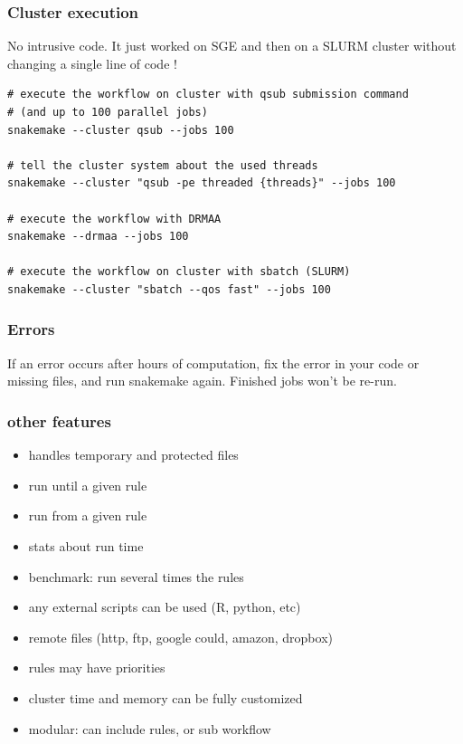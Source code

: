 \documentclass{beamer}
\begin{document}



\begin{frame}[fragile]
\frametitle{Cluster execution}

No intrusive code. It just worked on SGE and then on a SLURM cluster 
without changing a single line of code !

\begin{lstlisting}
# execute the workflow on cluster with qsub submission command
# (and up to 100 parallel jobs)
snakemake --cluster qsub --jobs 100

# tell the cluster system about the used threads
snakemake --cluster "qsub -pe threaded {threads}" --jobs 100

# execute the workflow with DRMAA
snakemake --drmaa --jobs 100

# execute the workflow on cluster with sbatch (SLURM)
snakemake --cluster "sbatch --qos fast" --jobs 100

\end{lstlisting}
\end{frame}


\begin{frame}
 \frametitle{Errors}
 
 If an error occurs after hours of computation, fix the error in your code or missing files, 
 and run snakemake again. Finished jobs won't be re-run. 
 
\end{frame}


\begin{frame}
\frametitle{other features}

\begin{itemize}
\item handles temporary and protected files
\item run until a given rule
\item run from a given rule
\item stats about run time
\item benchmark: run several times the rules
\item any external scripts can be used (R, python, etc)
\item remote files (http, ftp, google could, amazon, dropbox)
\item rules may have priorities
\item cluster time and memory can be fully customized
\item modular: can include rules, or sub workflow
\end{itemize}

\end{frame}
\end{document}

